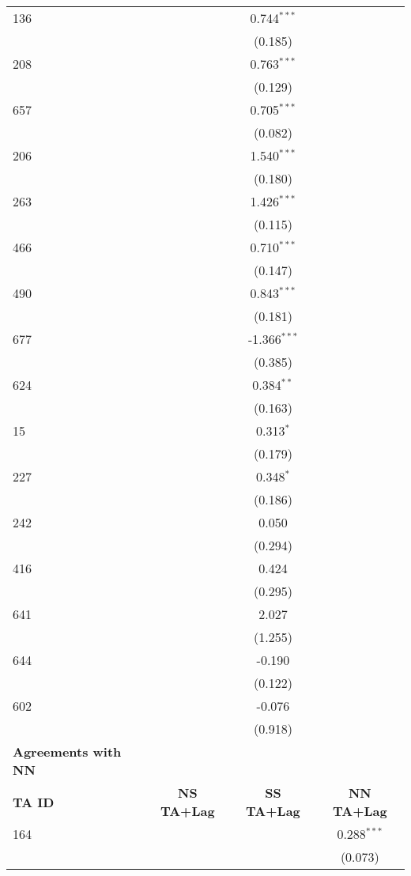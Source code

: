 \begin{center}
\begin{longtable}{lccc}
    136 &  & 0.744$^{\ast\ast\ast}$ &  \\
    &  & (0.185) &  \\
    208 &  & 0.763$^{\ast\ast\ast}$ &  \\
    &  & (0.129) &  \\
    657 &  & 0.705$^{\ast\ast\ast}$ &  \\
    &  & (0.082) &  \\
    206 &  & 1.540$^{\ast\ast\ast}$ &  \\
    &  & (0.180) &  \\
    263 &  & 1.426$^{\ast\ast\ast}$ &  \\
    &  & (0.115) &  \\
    466 &  & 0.710$^{\ast\ast\ast}$ &  \\
    &  & (0.147) &  \\
    490 &  & 0.843$^{\ast\ast\ast}$ &  \\
    &  & (0.181) &  \\
    677 &  & -1.366$^{\ast\ast\ast}$ &  \\
    &  & (0.385) &  \\
    624 &  & 0.384$^{\ast\ast}$ &  \\
    &  & (0.163) &  \\
    15  &  & 0.313$^{\ast}$ &  \\
    &  & (0.179) &  \\
    227  &  & 0.348$^{\ast}$ &  \\
    &  & (0.186) &  \\
    242  &  & 0.050 &  \\
    &  & (0.294) &  \\
    416  &  & 0.424 &  \\
    &  & (0.295) &  \\
    641  &  & 2.027 &  \\
    &  & (1.255) &  \\
    644  &  & -0.190 &  \\
    &  & (0.122) &  \\
    602  &  & -0.076 &  \\
    &  & (0.918) &  \\
    \hline
    \textbf{Agreements with NN} &  &  &  \\
    \hline
    \textbf{TA ID} & \textbf{NS TA+Lag} & \textbf{SS TA+Lag} & \textbf{NN TA+Lag} \\
    \hline
    164 &  &  & 0.288$^{\ast\ast\ast}$ \\
    &  &  & (0.073) \\

\end{longtable}
\end{center}

